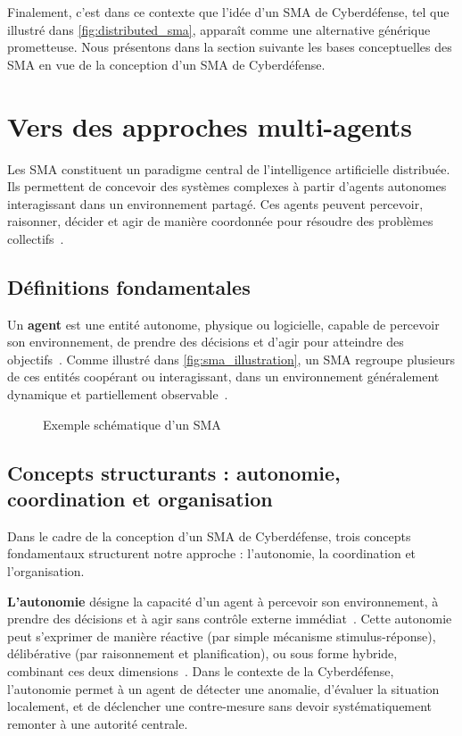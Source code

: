 \noindent
Finalement, c'est dans ce contexte que l'idée d'un \ac{SMA} de Cyberdéfense, tel que illustré dans \autoref{fig:distributed_sma}, apparaît comme une alternative générique prometteuse. Nous présentons dans la section suivante les bases conceptuelles des \ac{SMA} en vue de la conception d'un \ac{SMA} de Cyberdéfense.

\section{Vers des approches multi-agents}\label{sec:sma-concepts}

Les \ac{SMA} constituent un paradigme central de l'intelligence artificielle distribuée. Ils permettent de concevoir des systèmes complexes à partir d'agents autonomes interagissant dans un environnement partagé. Ces agents peuvent percevoir, raisonner, décider et agir de manière coordonnée pour résoudre des problèmes collectifs~\cite{Ferber1999,Wooldridge2002}.

\subsection*{Définitions fondamentales}

Un \textbf{agent} est une entité autonome, physique ou logicielle, capable de percevoir son environnement, de prendre des décisions et d'agir pour atteindre des objectifs~\cite{Russell2010}. Comme illustré dans \autoref{fig:sma_illustration}, un \ac{SMA} regroupe plusieurs de ces entités coopérant ou interagissant, dans un environnement généralement dynamique et partiellement observable~\cite{Jennings1998,Shoham2007}.

\begin{figure}[h]
    \centering
    \resizebox{\textwidth}{!}{%
        
    }
    \caption{Exemple schématique d'un SMA}
    \label{fig:sma_illustration}
\end{figure}

\subsection*{Concepts structurants : autonomie, coordination et organisation}

Dans le cadre de la conception d'un \ac{SMA} de Cyberdéfense, trois concepts fondamentaux structurent notre approche : l'autonomie, la coordination et l'organisation.

\textbf{L'autonomie} désigne la capacité d'un agent à percevoir son environnement, à prendre des décisions et à agir sans contrôle externe immédiat~\cite{Russell2010}. Cette autonomie peut s'exprimer de manière réactive (par simple mécanisme stimulus-réponse), délibérative (par raisonnement et planification), ou sous forme hybride, combinant ces deux dimensions~\cite{Georgeff1987}. Dans le contexte de la Cyberdéfense, l'autonomie permet à un agent de détecter une anomalie, d'évaluer la situation localement, et de déclencher une contre-mesure sans devoir systématiquement remonter à une autorité centrale.

